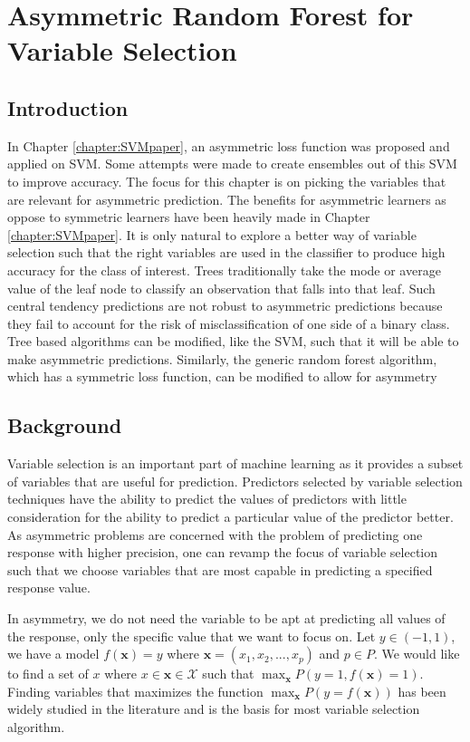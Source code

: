 
\chapter{Asymmetric Random Forest for Variable Selection}\label{chapter:AsymRFpaper}
\section{Introduction}
In Chapter \ref{chapter:SVMpaper}, an asymmetric loss function was proposed and applied on SVM. Some attempts were made to create ensembles out of this SVM to improve accuracy. The focus for this chapter is on picking the variables that are relevant for asymmetric prediction. The benefits for asymmetric learners as oppose to symmetric learners have been heavily made in Chapter \ref{chapter:SVMpaper}. It is only natural to explore a better way of variable selection such that the right variables are used in the classifier to produce high accuracy for the class of interest. Trees traditionally take the mode or average value of the leaf node to classify an observation that falls into that leaf. Such central tendency predictions are not robust to asymmetric predictions because they fail to account for the risk of misclassification of one side of a binary class. Tree based algorithms can be modified, like the SVM, such that it will be able to make asymmetric predictions. Similarly, the generic random forest algorithm, which has a symmetric loss function, can be modified to allow for asymmetry

\section{Background}
Variable selection is an important part of machine learning as it provides a subset of variables that are useful for prediction. Predictors selected by variable selection techniques have the ability to predict the values of predictors with little consideration for the ability to predict a particular value of the predictor better. As asymmetric problems are concerned with the problem of predicting one response with higher precision, one can revamp the focus of variable selection such that we choose variables that are most capable in predicting a specified response value.

In asymmetry, we do not need the variable to be apt at predicting all values of the response, only the specific value that we want to focus on. Let $y \in (-1,1)$, we have a model $f(\mathbf{x})=y$ where $\mathbf{x} = (x_1,x_2,...,x_p)$ and $p \in P$. We would like to find a set of $x$ where $x \in \mathbf{x} \in \mathcal{X}$ such that $\displaystyle\max_{\mathbf{x}}P(y=1,f(\mathbf{x})=1)$. Finding variables that maximizes the function $\displaystyle\max_{\mathbf{x}}P(y=f(\mathbf{x}))$ has been widely studied in the literature and is the basis for most variable selection algorithm. 

